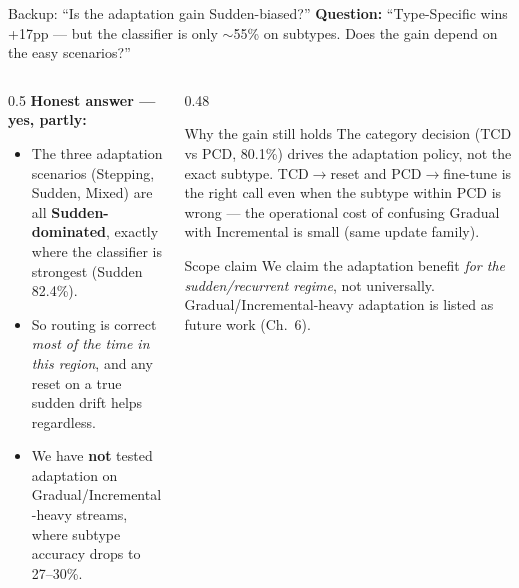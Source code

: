 \documentclass[aspectratio=169,10pt]{beamer}
\begin{document}
\begin{frame}{Backup: ``Is the adaptation gain Sudden-biased?''}
	\textbf{Question:} ``Type-Specific wins +17pp --- but the classifier is only $\sim$55\% on subtypes. Does the gain depend on the easy scenarios?''

	\vspace{0.5em}
	\begin{columns}[T]
		\begin{column}{0.5\textwidth}
			\textbf{Honest answer --- yes, partly:}
			\begin{itemize}
				\small
				\item The three adaptation scenarios (Stepping, Sudden, Mixed) are all \textbf{Sudden-dominated}, exactly where the classifier is strongest (Sudden 82.4\%).
				\item So routing is correct \emph{most of the time in this region}, and any reset on a true sudden drift helps regardless.
				\item We have \textbf{not} tested adaptation on Gradual/Incremental-heavy streams, where subtype accuracy drops to 27--30\%.
			\end{itemize}
		\end{column}
		\begin{column}{0.48\textwidth}
			\begin{exampleblock}{\small Why the gain still holds}
				\small
				The category decision (TCD vs PCD, 80.1\%) drives the adaptation policy, not the exact subtype. TCD$\to$reset and PCD$\to$fine-tune is the right call even when the subtype within PCD is wrong --- the operational cost of confusing Gradual with Incremental is small (same update family).
			\end{exampleblock}

			\vspace{0.3em}
			\begin{alertblock}{\small Scope claim}
				\scriptsize
				We claim the adaptation benefit \emph{for the sudden/recurrent regime}, not universally. Gradual/Incremental-heavy adaptation is listed as future work (Ch.\ 6).
			\end{alertblock}
		\end{column}
	\end{columns}
\end{frame}
\end{document}
